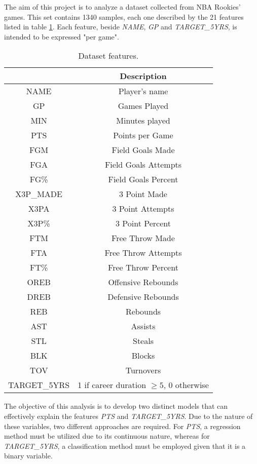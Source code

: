The aim of this project is to analyze a dataset collected from NBA Rookies' games. This set contains 1340 samples, each one described by the 21 features listed in table \ref{tab:1}. Each feature, beside \textit{NAME}, \textit{GP} and \textit{TARGET\_5YRS}, is intended to be expressed "per game".
\begin{table}[h]
	\centering
	\small
	\begin{tabular}{||c | c ||}
		\hline
		& Description\\
		\hline
		NAME & Player's name\\ 
		GP & Games Played\\ 
		MIN & Minutes played\\ 
		PTS & Points per Game\\
		FGM & Field Goals Made\\
		FGA & Field Goals Attempts\\
		FG\% & Field Goals Percent\\
		X3P\_MADE & 3 Point Made\\
		X3PA & 3 Point Attempts\\
		X3P\% & 3 Point Percent\\
		FTM & Free Throw Made\\
		FTA & Free Throw Attempts\\
		FT\% & Free Throw Percent\\
		OREB & Offensive Rebounds\\
		DREB & Defensive Rebounds\\
		REB & Rebounds\\
		AST & Assists\\
		STL & Steals\\
		BLK & Blocks\\
		TOV & Turnovers\\
		TARGET\_5YRS & 1 if career duration $\geq 5$, 0 otherwise\\
		\hline
	\end{tabular}
	\caption{Dataset features.}
	\label{tab:1}
\end{table} 

The objective of this analysis is to develop two distinct models that can effectively explain the features \textit{PTS} and \textit{TARGET\_5YRS}. Due to the nature of these variables, two different approaches are required. For \textit{PTS}, a regression method must be utilized due to its continuous nature, whereas for \textit{TARGET\_5YRS}, a classification method must be employed given that it is a binary variable.